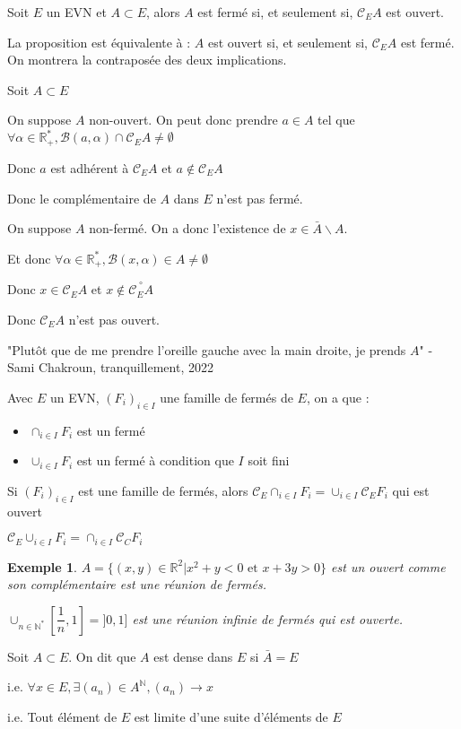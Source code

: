 \documentclass[a4paper,12pt]{book}
\newcommand{\Def}[2]{\begin{tcolorbox}[sharp corners, colback=white,colframe=blue!90!black!75, title=Définition : #1]#2\end{tcolorbox}}
\newcommand{\Thr}[2]{\begin{tcolorbox}[sharp corners, colback=white,colframe=red!90!black!75, title=Théorème : #1]#2\end{tcolorbox}}
\newcommand{\Prop}[2]{\begin{tcolorbox}[sharp corners, colback=white,colframe=red!90!black!75, title=Proposition : #1]#2\end{tcolorbox}}
\newcommand{\Pre}[1]{\begin{tcolorbox}[sharp corners, colback=white,colframe=green!60!green!30!black!75, title=Preuve]#1\end{tcolorbox}}
\newtheorem{Exe}{Exemple}[section]
\def\R{\mathbb{R}}
\def\N{\mathbb{N}}
\begin{document}
\Thr{Complémentarité d'un ouvert}{Soit $E$ un EVN et $A\subset E$, alors $A$ est fermé si, et seulement si, $\mathcal{C}_EA$ est ouvert.}
\Pre{La proposition est équivalente à : $A$ est ouvert si, et seulement si, $\mathcal{C}_EA$ est fermé. On montrera la contraposée des deux implications.
\par Soit $A\subset E$\par On suppose $A$ non-ouvert. On peut donc prendre $a\in A$ tel que $\forall\alpha\in\R_+^*, \mathcal{B}(a,\alpha)\cap \mathcal{C}_EA\neq\emptyset$ \par Donc $a$ est adhérent à $\mathcal{C}_EA$ et $a\notin\mathcal{C}_EA$ \par Donc le complémentaire de $A$ dans $E$ n'est pas fermé.
\par On suppose $A$ non-fermé. On a donc l'existence de $x\in\bar{A}\backslash A$. \par Et donc $\forall \alpha\in\R_+^*,\mathcal{B}(x, \alpha)\in A\neq\emptyset$ \par Donc $x\in\mathcal{C}_EA$ et $x\notin\overset{\circ}{\mathcal{C}_EA}$\par Donc $\mathcal{C}_EA$ n'est pas ouvert.}
"Plutôt que de me prendre l'oreille gauche avec la main droite, je prends $A$" - Sami Chakroun, tranquillement, 2022
\Prop{Réunion et intersection de fermés}{Avec $E$ un EVN, $(F_i)_{i\in I}$ une famille de fermés de $E$, on a que :\begin{itemize}
\item $\cap_{i\in I}F_i$ est un fermé
\item $\cup_{i\in I}F_i$ est un fermé à condition que $I$ soit fini\end{itemize}}
\Pre{Si $(F_i)_{i\in I}$ est une famille de fermés, alors $\mathcal{C}_E\cap_{i\in I}F_i=\cup_{i\in I}\mathcal{C}_EF_i$ qui est ouvert
\par $\mathcal{C}_E\cup_{i\in I}F_i=\cap_{i\in I}\mathcal{C}_CF_i$}
\begin{Exe}
$A=\{(x,y)\in\R^2\vert x^2+y<0\text{ et }x+3y>0\}$ est un ouvert comme son complémentaire est une réunion de fermés.
\par $\cup_{n\in\N^*}\left[\dfrac{1}{n}, 1\right] = ]0,1]$ est une réunion infinie de fermés qui est ouverte.
\end{Exe}
\Def{Densité}{Soit $A\subset E$. On dit que $A$ est dense dans $E$ si $\bar{A}=E$
\par i.e. $\forall x\in E,\exists (a_n)\in A^\N, (a_n)\to x$
\par i.e. Tout élément de $E$ est limite d'une suite d'éléments de $E$}
\end{document}
